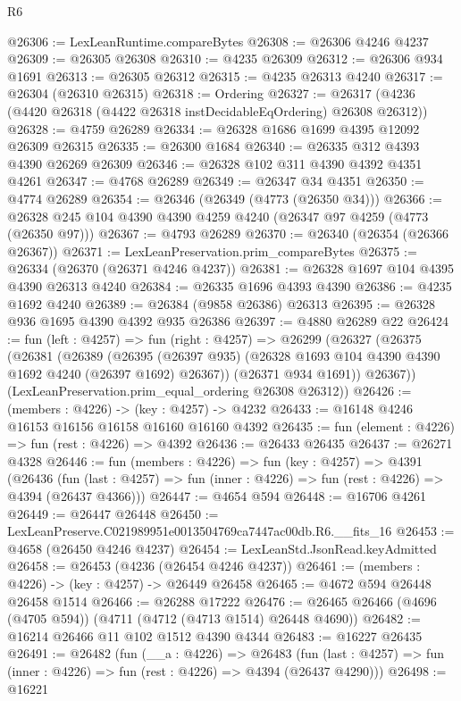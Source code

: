 \begin{lexlean}{R6}
\begin{coremodule}
@26306 := LexLeanRuntime.compareBytes
@26308 := @26306 @4246 @4237
@26309 := @26305 @26308
@26310 := @4235 @26309
@26312 := @26306 @934 @1691
@26313 := @26305 @26312
@26315 := @4235 @26313 @4240
@26317 := @26304 (@26310 @26315)
@26318 := Ordering
@26327 := @26317 (@4236 (@4420 @26318 (@4422 @26318 instDecidableEqOrdering) @26308 @26312))
@26328 := @4759 @26289
@26334 := @26328 @1686 @1699 @4395 @12092 @26309 @26315
@26335 := @26300 @1684
@26340 := @26335 @312 @4393 @4390 @26269 @26309
@26346 := @26328 @102 @311 @4390 @4392 @4351 @4261
@26347 := @4768 @26289
@26349 := @26347 @34 @4351
@26350 := @4774 @26289
@26354 := @26346 (@26349 (@4773 (@26350 @34)))
@26366 := @26328 @245 @104 @4390 @4390 @4259 @4240 (@26347 @97 @4259 (@4773 (@26350 @97)))
@26367 := @4793 @26289
@26370 := @26340 (@26354 (@26366 @26367))
@26371 := LexLeanPreservation.prim_compareBytes
@26375 := @26334 (@26370 (@26371 @4246 @4237))
@26381 := @26328 @1697 @104 @4395 @4390 @26313 @4240
@26384 := @26335 @1696 @4393 @4390
@26386 := @4235 @1692 @4240
@26389 := @26384 (@9858 @26386) @26313
@26395 := @26328 @936 @1695 @4390 @4392 @935 @26386
@26397 := @4880 @26289 @22
@26424 := fun (left : @4257) =>
  fun (right : @4257) =>
  @26299
    (@26327
      (@26375
        (@26381
          (@26389
            (@26395 (@26397 @935) (@26328 @1693 @104 @4390 @4390 @1692 @4240 (@26397 @1692) @26367))
            (@26371 @934 @1691))
          @26367))
      (LexLeanPreservation.prim_equal_ordering @26308 @26312))
@26426 := (members : @4226) -> (key : @4257) -> @4232
@26433 := @16148 @4246 @16153 @16156 @16158 @16160 @16160 @4392
@26435 := fun (element : @4226) => fun (rest : @4226) => @4392
@26436 := @26433 @26435
@26437 := @26271 @4328
@26446 := fun (members : @4226) =>
  fun (key : @4257) =>
  @4391
    (@26436
      (fun (last : @4257) => fun (inner : @4226) => fun (rest : @4226) => @4394 (@26437 @4366)))
@26447 := @4654 @594
@26448 := @16706 @4261
@26449 := @26447 @26448
@26450 := LexLeanPreserve.C021989951e0013504769ca7447ac00db.R6.__fits_16
@26453 := @4658 (@26450 @4246 @4237)
@26454 := LexLeanStd.JsonRead.keyAdmitted
@26458 := @26453 (@4236 (@26454 @4246 @4237))
@26461 := (members : @4226) -> (key : @4257) -> @26449 @26458
@26465 := @4672 @594 @26448 @26458 @1514
@26466 := @26288 @17222
@26476 := @26465 @26466 (@4696 (@4705 @594)) (@4711 (@4712 (@4713 @1514) @26448 @4690))
@26482 := @16214 @26466 @11 @102 @1512 @4390 @4344
@26483 := @16227 @26435
@26491 := @26482
    (fun (__a : @4226) =>
    @26483
      (fun (last : @4257) => fun (inner : @4226) => fun (rest : @4226) => @4394 (@26437 @4290)))
@26498 := @16221

\end{coremodule}
\end{lexlean}
